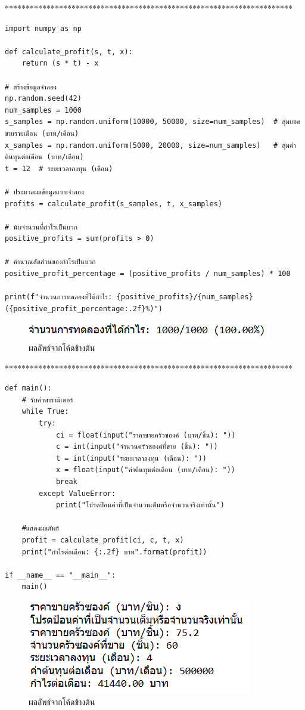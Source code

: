 \documentclass{report}
\begin{document}
*********************************************************************
\begin{verbatim}
import numpy as np

def calculate_profit(s, t, x):
    return (s * t) - x

# สร้างข้อมูลจำลอง
np.random.seed(42)
num_samples = 1000
s_samples = np.random.uniform(10000, 50000, size=num_samples)  # สุ่มยอดขายรายเดือน (บาท/เดือน)
x_samples = np.random.uniform(5000, 20000, size=num_samples)   # สุ่มค่าต้นทุนต่อเดือน (บาท/เดือน)
t = 12  # ระยะเวลาลงทุน (เดือน)

# ประมวลผลข้อมูลแบบจำลอง
profits = calculate_profit(s_samples, t, x_samples)

# นับจำนวนที่กำไรเป็นบวก
positive_profits = sum(profits > 0)

# คำนวณสัดส่วนของกำไรเป็นบวก
positive_profit_percentage = (positive_profits / num_samples) * 100

print(f"จำนวนการทดลองที่ได้กำไร: {positive_profits}/{num_samples} ({positive_profit_percentage:.2f}%)")
\end{verbatim}
\begin{figure}[!ht]
    \centering
    \includegraphics[scale=1.1]{A4.png}
    \caption{ผลลัพธ์จากโค้ดข้างต้น} 
\label{fig:mesh4}
\end{figure}
*********************************************************************
\begin{verbatim}
def main():
    # รับค่าพารามิเตอร์
    while True:
        try:
            ci = float(input("ราคาขายครัวซองค์ (บาท/ชิ้น): "))
            c = int(input("จำนวนครัวซองค์ที่ขาย (ชิ้น): "))
            t = int(input("ระยะเวลาลงทุน (เดือน): "))
            x = float(input("ค่าต้นทุนต่อเดือน (บาท/เดือน): "))
            break
        except ValueError:
            print("โปรดป้อนค่าที่เป็นจำนวนเต็มหรือจำนวนจริงเท่านั้น")

    #แสดงผลลัพธ์
    profit = calculate_profit(ci, c, t, x)
    print("กำไรต่อเดือน: {:.2f} บาท".format(profit))

if __name__ == "__main__":
    main()
\end{verbatim}
\begin{figure}[!ht]
    \centering
    \includegraphics[scale=0.85]{A3.png}
    \caption{ผลลัพธ์จากโค้ดข้างต้น} 
\label{fig:mesh3}
\end{figure}
\end{document}
